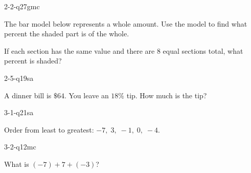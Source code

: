 \begin{practiceQuestion}{2-2-q27}{gmc}
\begin{questionText}
The bar model below represents a whole amount. Use the model to find what percent the shaded part is of the whole.

\begin{center}
\end{center}

If each section has the same value and there are $8$ equal sections total, what percent is shaded?
\end{questionText}
\end{practiceQuestion}

\begin{practiceQuestion}{2-5-q19}{sa}
\begin{questionText}
A dinner bill is $\$64$. You leave an $18\%$ tip. How much is the tip?
\end{questionText}
\end{practiceQuestion}

\begin{practiceQuestion}{3-1-q21}{sa}
\begin{questionText}
Order from least to greatest: $-7, \; 3, \; -1, \; 0, \; -4$.
\end{questionText}
\end{practiceQuestion}

\begin{practiceQuestion}{3-2-q12}{mc}
\begin{questionText}
What is $(-7) + 7 + (-3)$?
\end{questionText}
\end{practiceQuestion}

